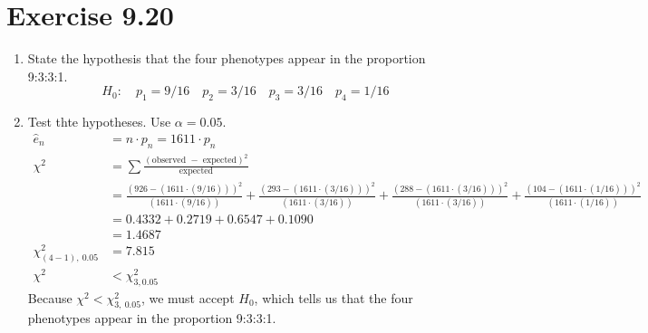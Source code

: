 \documentclass{article}
\begin{document}
\section*{Exercise 9.20}

\begin{enumerate}[\quad(a)]
	\item State the hypothesis that the four phenotypes appear in the proportion 9:3:3:1.
		$$ H_0 : \quad p_1 = 9/16 \quad p_2 = 3/16 \quad p_3 = 3/16 \quad p_4 = 1/16 $$
	\item Test thte hypotheses. Use $\alpha = 0.05$.
	\begin{align*}
		\hat{e}_n &= n \cdot p_n = 1611 \cdot p_n\\
		\chi^2 &= \sum \frac{(\text{observed } - \text{ expected})^2}{\text{expected}}\\
		&= \frac{(926 - (1611 \cdot (9 / 16)))^2}{(1611 \cdot (9 / 16))} %
		 + \frac{(293 - (1611 \cdot (3 / 16)))^2}{(1611 \cdot (3 / 16))} %
		 + \frac{(288 - (1611 \cdot (3 / 16)))^2}{(1611 \cdot (3 / 16))} %
		 + \frac{(104 - (1611 \cdot (1 / 16)))^2}{(1611 \cdot (1 / 16))}\\
		&= 0.4332 + 0.2719 + 0.6547 + 0.1090 \\
		&= 1.4687\\
		\chi^2_{(4-1),\ 0.05} &= 7.815\\
		\chi^2 &< \chi^2_{3, 0.05}
	\end{align*}
	Because $\chi^2 < \chi^2_{3,\ 0.05}$, we must accept $H_0$, which tells us that the four phenotypes appear in the proportion 9:3:3:1.
\end{enumerate}
\end{document}
